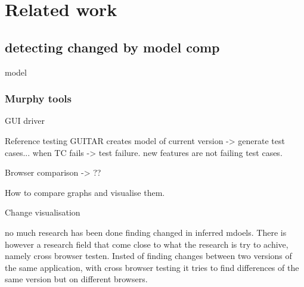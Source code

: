 \chapter{Related work}


\section{detecting changed by model comp} 

model 

\subsection{Murphy tools}

GUI driver 

Reference testing GUITAR creates model of current version -> generate test cases... when TC fails -> test failure. 
new features are not failing test cases. 

Browser comparison -> ??

How to compare graphs and visualise them. 

Change visualisation

no much research has been done finding changed in inferred mdoels. There is however a research field that come close to what the research is try to achive, namely cross browser testen. Insted of finding changes between two versions of the same application, with cross browser testing it tries to find differences of the same version but on different browsers.




